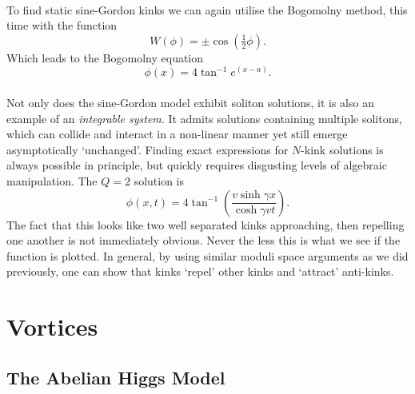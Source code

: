 \documentclass[11pt, fleqn]{article}
\begin{document}
\paragraph{} To find static sine-Gordon kinks we can again utilise the Bogomolny method, this time with the function
	\begin{equation}\label{key}
		W(\phi) = \pm \cos \left( \tfrac{1}{2} \phi \right).
	\end{equation}
Which leads to the Bogomolny equation
	\begin{equation}\label{key}
		\phi(x) = 4 \tan^{-1} e^{(x-a)}.
	\end{equation}
	
\paragraph{} Not only does the sine-Gordon model exhibit soliton solutions, it is also an example of an \textit{integrable system}. It admits solutions containing multiple solitons, which can collide and interact in a non-linear manner yet still emerge asymptotically `unchanged'. Finding exact expressions for $ N $-kink solutions is always possible in principle, but quickly requires disgusting levels of algebraic manipulation. The $ Q = 2 $ solution is
	\begin{equation}\label{key}
		\phi(x,t) = 4 \tan^{-1}\left( \frac{v \sinh \gamma x}{\cosh \gamma v t} \right).
	\end{equation}
The fact that this looks like two well separated kinks approaching, then repelling one another is not immediately obvious. Never the less this is what we see if the function is plotted. In general, by using similar moduli space arguments as we did previously, one can show that kinks `repel' other kinks and `attract' anti-kinks.

\section{Vortices}

\subsection{The Abelian Higgs Model}
\end{document}
